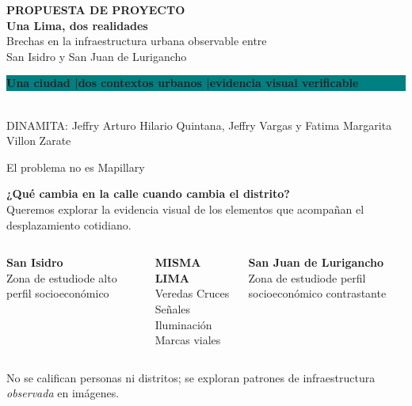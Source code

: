 \documentclass[aspectratio=169,10pt]{beamer}
\newcommand{\tagbox}[2]{\colorbox{#1}{\parbox[c][0.7cm][c]{0.92\linewidth}{\centering\color{white}\textbf{#2}}}}
\begin{document}
\begin{frame}[plain]
  \vspace{0.55cm}
  {\color{coral}\Large\textbf{PROPUESTA DE PROYECTO}}\\[0.4cm]
  {\color{navy}\fontsize{27}{31}\selectfont\textbf{Una Lima, dos realidades}}\\[0.25cm]
  {\large Brechas en la infraestructura urbana observable entre\\ San Isidro y San Juan de Lurigancho}\\[0.8cm]
  \tagbox{teal}{Una ciudad \quad|\quad dos contextos urbanos \quad|\quad evidencia visual verificable}\\[0.55cm]
  \small DINAMITA: Jeffry Arturo Hilario Quintana, Jeffry Vargas y Fatima Margarita Villon Zarate
\end{frame}

\begin{frame}{El problema no es Mapillary}
\begin{center}
\Large\textbf{¿Qué cambia en la calle cuando cambia el distrito?}\\[0.25cm]
\normalsize Queremos explorar la evidencia visual de los elementos que acompañan el desplazamiento cotidiano.
\end{center}
\vspace{0.45cm}
\begin{columns}[T,onlytextwidth]
\colorbox{sand}{\parbox[c][2.7cm][c]{0.96\linewidth}{\centering\Large\textbf{San Isidro}\\[5pt]\normalsize Zona de estudio\newline de alto perfil socioeconómico}}
\centering\vspace{0.55cm}
{\color{coral}\Large\textbf{MISMA LIMA}}\\[6pt]
\small Veredas \quad Cruces \quad Señales\\ Iluminación \quad Marcas viales
\colorbox{mist}{\parbox[c][2.7cm][c]{0.96\linewidth}{\centering\Large\textbf{San Juan de Lurigancho}\\[5pt]\normalsize Zona de estudio\newline de perfil socioeconómico contrastante}}
\end{columns}
\vspace{0.35cm}
\centering\scriptsize No se califican personas ni distritos; se exploran patrones de infraestructura \emph{observada} en imágenes.
\end{frame}
\end{document}
